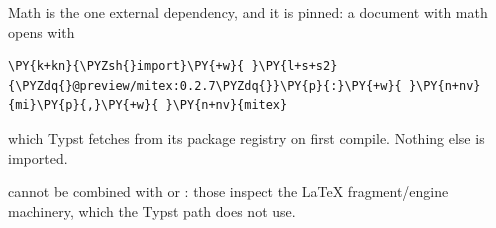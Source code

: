 \documentclass[a4paper,twoside]{article}
\begin{document}
Math is the one external dependency, and it is pinned: a document with math
opens with
\begin{tscode}[lang=typst, engine=pygments]
\begin{Verbatim}[commandchars=\\\{\},breaklines, breakanywhere, commandchars=\\\{\}]
\PY{k+kn}{\PYZsh{}import}\PY{+w}{ }\PY{l+s+s2}{\PYZdq{}@preview/mitex:0.2.7\PYZdq{}}\PY{p}{:}\PY{+w}{ }\PY{n+nv}{mi}\PY{p}{,}\PY{+w}{ }\PY{n+nv}{mitex}
\end{Verbatim}
\end{tscode}
which Typst fetches from its package registry on first compile. Nothing else is
imported.
\begin{tscallout}[kind=note, title={Typst output and \LaTeX{}-only flags}]
 cannot be combined with  or
: those inspect the \LaTeX{} fragment/engine machinery,
which the Typst path does not use.
\end{tscallout}
\end{document}
